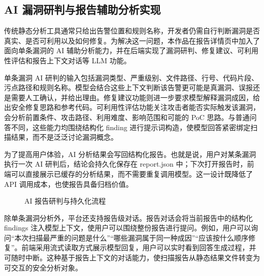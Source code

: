 \documentclass[a4paper,12pt,UTF8]{ctexart}
\numberwithin{figure}{section}
\numberwithin{table}{section}
\numberwithin{equation}{section}
\begin{document}
\subsection{AI 漏洞研判与报告辅助分析实现}

{\songti
传统静态分析工具通常只给出告警位置和规则名称，开发者仍需自行判断漏洞是否真实、是否可利用以及如何修复。为解决这一问题，本作品在报告详情页中加入了面向单条漏洞的 AI 辅助分析能力，并在后端实现了漏洞研判、修复建议、可利用性评估和报告上下文对话等 LLM 功能。

单条漏洞 AI 研判的输入包括漏洞类型、严重级别、文件路径、行号、代码片段、污点路径和规则名称。模型会结合这些上下文判断该告警更可能是真漏洞、误报还是需要人工确认，并给出理由。修复建议功能则进一步要求模型解释漏洞成因，给出安全修复思路和参考代码。可利用性评估功能关注攻击者能否实际触发该漏洞，会分析前置条件、攻击路径、利用难度、影响范围和可能的 PoC 思路。与普通问答不同，这些能力均围绕结构化 finding 进行提示词构造，使模型回答紧密绑定扫描结果，而不是泛泛讨论漏洞概念。

为了提高用户体验，AI 分析结果会写回结构化报告。也就是说，用户对某条漏洞执行一次 AI 研判后，结论会持久化保存在 report.json 中；下次打开报告时，前端可以直接展示已缓存的分析结果，而不需要重复调用模型。这一设计既降低了 API 调用成本，也使报告具备归档价值。
\par}

\begin{figure}[htbp]
\centering
{}
\caption{AI 报告研判与持久化流程}
\label{fig:ai-report-flow}
\end{figure}

{\songti
除单条漏洞分析外，平台还支持报告级对话。报告对话会将当前报告中的结构化 findings 注入模型上下文，使用户可以围绕整份报告进行提问。例如，用户可以询问“本次扫描最严重的问题是什么”“哪些漏洞属于同一种成因”“应该按什么顺序修复”。前端采用流式读取方式展示模型回复，用户可以实时看到回答生成过程，并可随时中断。这种基于报告上下文的对话能力，使扫描报告从静态结果文件转变为可交互的安全分析对象。
\par}
\end{document}
